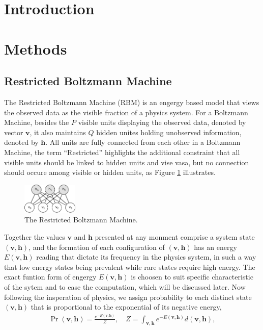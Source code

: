 \documentclass[11pt]{article}
\newcommand{\vh}{\boldsymbol{h}}
\newcommand{\vv}{\boldsymbol{v}}
\begin{document}
\section*{Introduction}

\section*{Methods}

\subsection*{Restricted Boltzmann Machine}
The Restricted Boltzmann Machine (RBM) is an engergy based model that views the observed data as the visible fraction of a physics system. For a Boltzmann Machine, besides the $P$ visible units displaying the observed data, denoted by vector $\vv$, it also maintains $Q$ hidden unites holding unobserved information, denoted by $\vh$. All units are fully connected from each other in a Boltzmann Machine, the term ``Restricted'' highlights the additional constraint that all visible units should be linked to hidden units and vise vasa, but no connection should occure among visible or hidden units, as Figure \ref{fig:rbm} illustrates.
\begin{figure}[!htbp]
  \centering
  \includegraphics[width=100px]{img/rbm.png}
  \caption{The Restricted Boltzmann Machine.}\label{fig:rbm}
\end{figure}
Together the values $\vv$ and $\vh$ presented at any monment comprise a system state $(\vv, \vh)$, and the formation of each configuration of $(\vv, \vh)$ has an energy $E(\vv, \vh)$ reading that dictate its frequency in the physics system, in such a way that low energy states being prevalent while rare states require high energy. The exact funtion form of engergy $E(\vv, \vh)$ is choosen to suit specific characteristic of the sytem and to ease the computation, which will be discussed later. Now following the insperation of physics, we assign probability to each distinct state $(\vv, \vh)$ that is proportional to the exponential of its negative energy,
\begin{equation} \label{eq:prob0}
  \begin{split}
    \Pr(\vv, \vh) = \frac{e^{-E(\vv, \vh)}}{Z}, \quad Z = \int_{\vv,\vh}{e^{-E(\vv, \vh)}d(\vv, \vh)},
  \end{split}
\end{equation}
\end{document}
